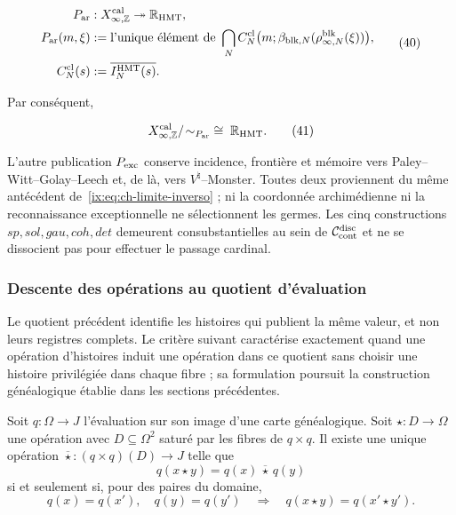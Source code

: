 \[
\begin{aligned}
 P_{\rm ar}&:X_{\infty,\mathbb Z}^{\rm cal}
     \twoheadrightarrow\mathbb R_{\rm HMT},\\
 P_{\rm ar}(m,\xi)
   &:=\text{l'unique élément de }
     \bigcap_N C_N^{\rm cl}
       \bigl(m;\beta_{{\rm blk},N}(\rho^{\rm blk}_{\infty,N}(\xi))\bigr),\\
 C_N^{\rm cl}(s)&:=\overline{I_N^{\rm HMT}(s)}.
\end{aligned}
\tag{40}\label{ix:eq:ch-proyeccion-arquimediana}
\]

Par conséquent,

\[
 X_{\infty,\mathbb Z}^{\rm cal}/\!\sim_{P_{\rm ar}}
 \;\cong\;\mathbb R_{\rm HMT}.
\tag{41}\label{ix:eq:ch-cociente-recta}
\]

L’autre publication \(P_{\rm exc}\) conserve incidence, frontière et mémoire
vers Paley--Witt--Golay--Leech et, de là, vers
\(V^\natural\)--Monster. Toutes deux proviennent du
même antécédent de~\eqref{ix:eq:ch-limite-inverso} ; ni la coordonnée archimédienne ni la reconnaissance
exceptionnelle ne sélectionnent les germes. Les cinq constructions
\(sp,sol,gau,coh,det\) demeurent consubstantielles au sein de
\(\mathcal C_{\rm cont}^{\rm disc}\) et ne se dissocient pas pour effectuer le passage
cardinal.


\subsubsection{Descente des opérations au quotient d’évaluation}
\label{ix:sec:ch-descenso-fibras}

Le quotient précédent identifie les histoires qui publient la même valeur, et non
leurs registres complets. Le critère suivant caractérise exactement
quand une opération d’histoires induit une opération dans ce quotient sans
choisir une histoire privilégiée dans chaque fibre ; sa formulation
poursuit la construction généalogique établie dans les sections précédentes.

\begin{proposition}
\label{ix:prop:ch-descenso-fibras}
Soit \(q:\Omega\to J\) l’évaluation sur son image d’une carte
généalogique. Soit \(\star:D\to\Omega\) une opération avec
\(D\subseteq\Omega^2\) saturé par les fibres de \(q\times q\).
Il existe une unique opération
\(\overline\star:(q\times q)(D)\to J\) telle que
\[
 q(x\star y)=q(x)\,\overline\star\,q(y)
\]
si et seulement si, pour des paires du domaine,
\[
 q(x)=q(x'),\quad q(y)=q(y')
 \quad\Longrightarrow\quad q(x\star y)=q(x'\star y').
\]
\end{proposition}


